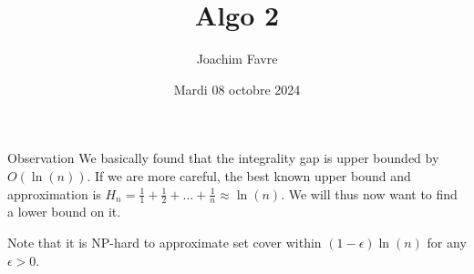 \documentclass[a4paper]{article}
\title{Algo 2}
\author{Joachim Favre}
\date{Mardi 08 octobre 2024}
\begin{document}
\maketitle


\begin{parag}{Observation}
    We basically found that the integrality gap is upper bounded by $O\left(\ln\left(n\right)\right)$. If we are more careful, the best known upper bound and approximation is $H_n = \frac{1}{1} + \frac{1}{2} + \ldots + \frac{1}{n} \approx \ln\left(n\right)$. We will thus now want to find a lower bound on it.

    Note that it is NP-hard to approximate set cover within $\left(1 - \epsilon\right)\ln\left(n\right)$ for any $\epsilon > 0$.
\end{parag}
\end{document}
